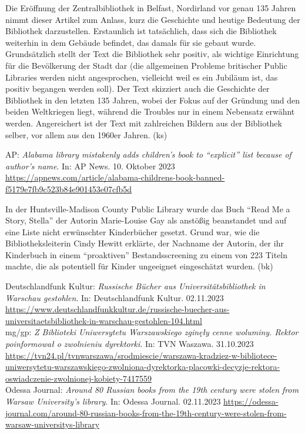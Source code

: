 \documentclass[a4paper,
fontsize=11pt,
oneside,
numbers=noperiodatend,
parskip=half-,
bibliography=totoc,
final
]{scrartcl}
\begin{document}
Die Eröffnung der Zentralbibliothek in Belfast, Nordirland vor genau 135
Jahren nimmt dieser Artikel zum Anlass, kurz die Geschichte und heutige
Bedeutung der Bibliothek darzustellen. Erstaunlich ist tatsächlich, dass
sich die Bibliothek weiterhin in dem Gebäude befindet, das damals für
sie gebaut wurde. Grundsätzlich stellt der Text die Bibliothek sehr
positiv, als wichtige Einrichtung für die Bevölkerung der Stadt dar (die
allgemeinen Probleme britischer Public Libraries werden nicht
angesprochen, vielleicht weil es ein Jubiläum ist, das positiv begangen
werden soll). Der Text skizziert auch die Geschichte der Bibliothek in
den letzten 135 Jahren, wobei der Fokus auf der Gründung und den beiden
Weltkriegen liegt, während die Troubles nur in einem Nebensatz erwähnt
werden. Angereichert ist der Text mit zahlreichen Bildern aus der
Bibliothek selber, vor allem aus den 1960er Jahren. (ks)

AP: \emph{Alabama library mistakenly adds children's book to
\enquote{explicit} list because of author's name}. In: AP News. 10.
Oktober 2023
\url{https://apnews.com/article/alabama-childrens-book-banned-f5179e7fb9c523b84e901453e07cfb5d}

In der Huntsville-Madison County Public Library wurde das Buch
\enquote{Read Me a Story, Stella} der Autorin Marie-Louise Gay als
anstößig beanstandet und auf eine Liste nicht erwünschter Kinderbücher
gesetzt. Grund war, wie die Bibliotheksleiterin Cindy Hewitt erklärte,
der Nachname der Autorin, der ihr Kinderbuch in einem
\enquote{proaktiven} Bestandsscreening zu einem von 223 Titeln machte,
die als potentiell für Kinder ungeeignet eingeschätzt wurden. (bk)

Deutschlandfunk Kultur: \emph{Russische Bücher aus
Universitätsbibliothek in Warschau gestohlen}. In: Deutschlandfunk
Kultur. 02.11.2023
\url{https://www.deutschlandfunkkultur.de/russische-buecher-aus-universitaetsbibliothek-in-warschau-gestohlen-104.html}\\
mg/gp: \emph{Z Biblioteki Uniwersytetu Warszawskiego zginęły cenne
woluminy. Rektor poinformował o zwolnieniu dyrektorki}. In: TVN Waszawa.
31.10.2023
\url{https://tvn24.pl/tvnwarszawa/srodmiescie/warszawa-kradziez-w-bibliotece-uniwersytetu-warszawskiego-zwolniona-dyrektorka-placowki-decyzje-rektora-oswiadczenie-zwolnionej-kobiety-7417559}\\
Odessa Journal: \emph{Around 80 Russian books from the 19th century were
stolen from Warsaw University's library}. In: Odessa Journal. 02.11.2023
\url{https://odessa-journal.com/around-80-russian-books-from-the-19th-century-were-stolen-from-warsaw-universitys-library}
\end{document}
